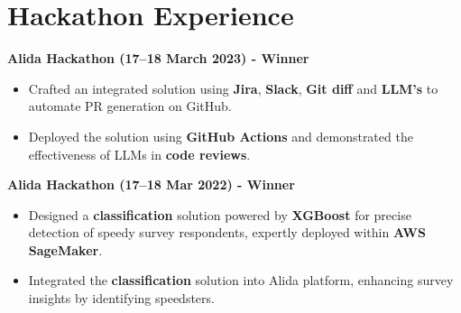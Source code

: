 \documentclass[11pt,a4paper]{article}
\begin{document}
\section{Hackathon Experience}

\noindent\textbf{Alida Hackathon (17--18 March 2023) - Winner}
\begin{itemize}[leftmargin=*, itemsep=1pt, topsep=2pt]
  \item Crafted an integrated solution using \textbf{Jira}, \textbf{Slack}, \textbf{Git diff} and \textbf{LLM's} to automate PR generation on GitHub.
  \item Deployed the solution using \textbf{GitHub Actions} and demonstrated the effectiveness of LLMs in \textbf{code reviews}.
\end{itemize}

\noindent\textbf{Alida Hackathon (17--18 Mar 2022) - Winner}
\begin{itemize}[leftmargin=*, itemsep=1pt, topsep=2pt]
  \item Designed a \textbf{classification} solution powered by \textbf{XGBoost} for precise detection of speedy survey respondents, expertly deployed within \textbf{AWS SageMaker}.
  \item Integrated the \textbf{classification} solution into Alida platform, enhancing survey insights by identifying speedsters.
\end{itemize}
\end{document}
